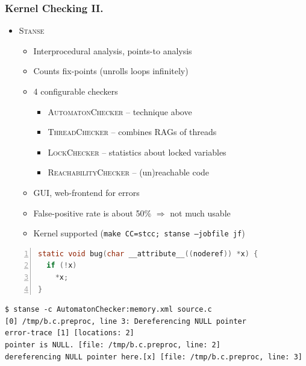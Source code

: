 \documentclass[handout,xcolor=dvipsnames]{beamer}
\begin{document}
\begin{frame}[fragile]
  \frametitle{Kernel Checking II.}
  \begin{itemize}
  \item[(3)] \textsc{Stanse}
  \begin{itemize}
  \item Interprocedural analysis, points-to analysis
  \item Counts fix-points (unrolls loops infinitely)
  \item 4 configurable checkers
  \begin{itemize}
  \item \textsc{AutomatonChecker} -- technique above
  \item \textsc{ThreadChecker} -- combines RAGs of threads
  \item \textsc{LockChecker} -- statistics about locked variables
  \item \textsc{ReachabilityChecker} -- (un)reachable code
  \end{itemize} \pause
  \item GUI, web-frontend for errors
  \item False-positive rate is about 50\% $\Rightarrow$ not much usable
  \item Kernel supported (\texttt{make CC=stcc; stanse --jobfile jf})
  \end{itemize}
  \end{itemize} \pause

  \begin{lstlisting}[language=C,numbers=left,numbersep=2pt]
static void bug(char __attribute__((noderef)) *x) {
  if (!x)
    *x;
}
  \end{lstlisting}
  \begin{lstlisting}[language=XML]
$ stanse -c AutomatonChecker:memory.xml source.c
[0] /tmp/b.c.preproc, line 3: Dereferencing NULL pointer
error-trace [1] [locations: 2]
pointer is NULL. [file: /tmp/b.c.preproc, line: 2]
dereferencing NULL pointer here.[x] [file: /tmp/b.c.preproc, line: 3]
  \end{lstlisting}

\end{frame}
\end{document}
